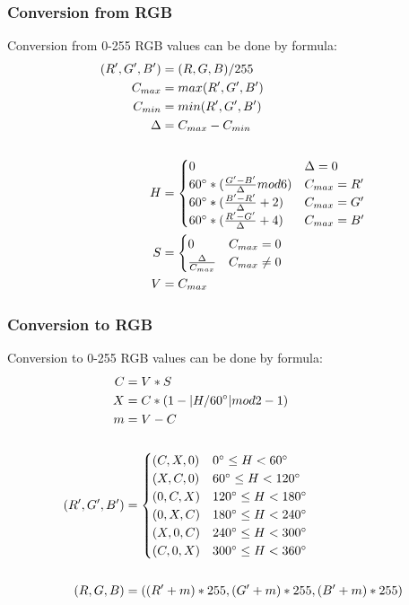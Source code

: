 \documentclass[titlepage]{article}
\begin{document}
\subsubsection{Conversion from RGB}
Conversion from 0-255 RGB values can be done by formula:
\begin{equation}
\begin{split}
(R', G', B')&=(R, G, B)/255\\
C_{max}&=max(R', G', B')\\
C_{min}&=min(R', G', B')\\
\Delta&=C_{max}-C_{min}\\
\\
H&=\begin{cases}
0 & \Delta=0 \\
60\degree*(\frac{G'-B'}{\Delta}mod6) & C_{max}=R' \\
60\degree*(\frac{B'-R'}{\Delta}+2) & C_{max}=G' \\
60\degree*(\frac{R'-G'}{\Delta}+4) & C_{max}=B'
\end{cases} \\
S&=\begin{cases}
0 & C_{max}=0 \\
\frac{\Delta}{C_{max}} & C_{max} \neq 0
\end{cases}\\
V&=C_{max}
\end{split}
\end{equation}

\subsubsection{Conversion to RGB}
Conversion to 0-255 RGB values can be done by formula:
\begin{equation}
\begin{split}
C&=V*S\\
X&=C*(1-|H/60\degree|mod2-1)\\
m&=V-C\\
\\
(R', G', B')&=\begin{cases}
(C, X, 0) & 0\degree\leq H < 60\degree\\
(X, C, 0) & 60\degree\leq H < 120\degree\\
(0, C, X) & 120\degree\leq H<180\degree\\
(0, X, C) & 180\degree\leq H<240\degree\\
(X, 0, C) & 240\degree\leq H<300\degree\\
(C, 0, X) & 300\degree\leq H<360\degree
\end{cases}\\
\\
(R, G, B)&=((R'+m)*255, (G'+m)*255, (B'+m)*255)
\end{split}
\end{equation}
\end{document}
